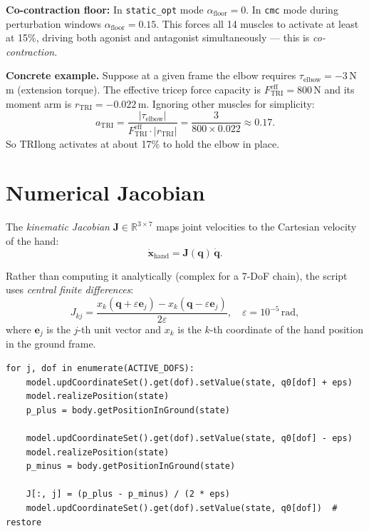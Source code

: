 \documentclass[11pt,a4paper]{article}
\begin{document}
\textbf{Co-contraction floor:} In \texttt{static\_opt} mode
$\alpha_\text{floor}=0$. In \texttt{cmc} mode during perturbation windows
$\alpha_\text{floor}=0.15$. This forces all 14 muscles to activate at
least at 15\%, driving both agonist and antagonist simultaneously --- this
is \emph{co-contraction}.

\textbf{Concrete example.} Suppose at a given frame the elbow requires
$\tau_\text{elbow}=-3\,$N\,m (extension torque). The effective tricep force
capacity is $F_\text{TRI}^\text{eff}=800\,$N and its moment arm is
$r_\text{TRI}=-0.022\,$m. Ignoring other muscles for simplicity:
\[
  a_\text{TRI} = \frac{|\tau_\text{elbow}|}{F_\text{TRI}^\text{eff}
                  \cdot|r_\text{TRI}|}
               = \frac{3}{800\times0.022} \approx 0.17.
\]
So TRIlong activates at about 17\% to hold the elbow in place.

\section{Numerical Jacobian}

The \emph{kinematic Jacobian} $\mathbf{J}\in\mathbb{R}^{3\times7}$ maps
joint velocities to the Cartesian velocity of the hand:
\[
  \dot{\bm{x}}_\text{hand} = \mathbf{J}(\bm{q})\,\dot{\bm{q}}.
\]

Rather than computing it analytically (complex for a 7-DoF chain), the
script uses \emph{central finite differences}:
\[
  J_{kj} = \frac{x_k(\bm{q}+\varepsilon\bm{e}_j)
                -x_k(\bm{q}-\varepsilon\bm{e}_j)}{2\varepsilon},
  \quad \varepsilon = 10^{-5}\,\text{rad},
\]
where $\bm{e}_j$ is the $j$-th unit vector and $x_k$ is the $k$-th
coordinate of the hand position in the ground frame.

\begin{lstlisting}[caption={Central FD Jacobian (simplified)}]
for j, dof in enumerate(ACTIVE_DOFS):
    model.updCoordinateSet().get(dof).setValue(state, q0[dof] + eps)
    model.realizePosition(state)
    p_plus = body.getPositionInGround(state)

    model.updCoordinateSet().get(dof).setValue(state, q0[dof] - eps)
    model.realizePosition(state)
    p_minus = body.getPositionInGround(state)

    J[:, j] = (p_plus - p_minus) / (2 * eps)
    model.updCoordinateSet().get(dof).setValue(state, q0[dof])  # restore
\end{lstlisting}
\end{document}
